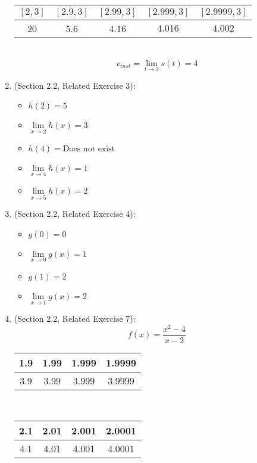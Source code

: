 \documentclass{article}
\begin{document}
\begin{enumerate}
	    \begin{tabular}{| c | c | c | c | c |}
            \hline
	        $[2,3]$&$[2.9,3]$&$[2.99,3]$&$[2.999,3]$&$[2.9999,3]$ \\
            \hline
	        20 & 5.6 & 4.16 & $4.016$ & $4.002$ \\
            \hline
        \end{tabular} \\
    
	    $$v_{inst} = \lim_{t \to 3}{s(t)} = 4$$
    \item (Section 2.2, Related Exercise 3):
        \begin{itemize}
		    \item $h(2) = 5$
		    \item $\lim\limits_{x \to 2}{h(x)} = 3$
		    \item $h(4) = \text{Does not exist}$
		    \item $\lim\limits_{x \to 4}{h(x)} = 1$
		    \item $\lim\limits_{x \to 5}{h(x)} = 2$
        \end{itemize}
    \item (Section 2.2, Related Exercise 4):
        \begin{itemize}
		    \item $g(0) = 0$
		    \item $\lim\limits_{x \to 0}{g(x)} = 1$
		    \item $g(1) = 2$
		    \item $\lim\limits_{x \to 1}{g(x)} = 2$
        \end{itemize}
    \item (Section 2.2, Related Exercise 7):
	    $$f(x) = \frac{x^2 - 4}{x - 2}$$
    
	    \begin{tabular}{| c | c | c | c |}
            \hline
	        1.9 & 1.99 & 1.999 & 1.9999 \\
            \hline
	        3.9 & 3.99 & 3.999 & 3.9999 \\
            \hline
        \end{tabular} \\
    
	    \begin{tabular}{| c | c | c | c |}
            \hline
	        2.1 & 2.01 & 2.001 & 2.0001 \\
            \hline
	        4.1 & 4.01 & 4.001 & 4.0001 \\
            \hline
        \end{tabular} \\
    

\end{enumerate}
\end{document}
